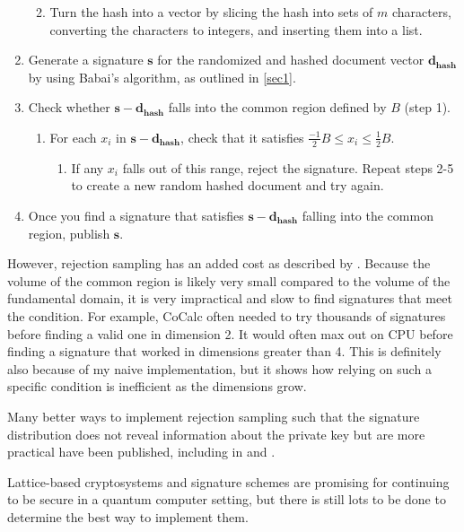 \documentclass[11pt,reqno]{amsart}
\theoremstyle{definition}
\begin{document}
\begin{enumerate}
\begin{enumerate}
\begin{enumerate}
        \end{enumerate}
        \item Turn the hash into a vector by slicing the hash into sets of $m$ characters, converting the characters to integers, and inserting them into a list.
    \end{enumerate}
    \item Generate a signature $\mathbf{s}$ for the randomized and hashed document vector $\mathbf{d_{\text{hash}}}$ by using Babai's algorithm, as outlined in \ref{sec1}.
    \item Check whether $\mathbf{s - d_{\text{hash}}}$ falls into the common region defined by $B$ (step 1).
    \begin{enumerate}
        \item For each $x_i$ in $\mathbf{s - d_{\text{hash}}}$, check that it satisfies $\frac{-1}{2}B \leq x_i \leq \frac{1}{2}B$.
        \begin{enumerate}
            \item If any $x_i$ falls out of this range, reject the signature. Repeat steps 2-5 to create a new random hashed document and try again.
        \end{enumerate}
    \end{enumerate}
    \item Once you find a signature that satisfies $\mathbf{s - d_{\text{hash}}}$ falling into the common region, publish $\mathbf{s}$.
\end{enumerate}

\vspace{\baselineskip}
However, rejection sampling has an added cost as described by \cite{lubshevky}. Because the volume of the common region is likely very small compared to the volume of the fundamental domain, it is very impractical and slow to find signatures that meet the condition. For example, CoCalc often needed to try thousands of signatures before finding a valid one in dimension 2.
It would often max out on CPU before finding a signature that worked in dimensions greater than 4. This is definitely also because of my naive implementation, but it shows how relying on such a specific condition is inefficient as the dimensions grow.

Many better ways to implement rejection sampling such that the signature distribution does not reveal information about the private key but are more practical have been published, including in \cite{lubshevky} and \cite{betterschemes}.

Lattice-based cryptosystems and signature schemes are promising for continuing to be secure in a quantum computer setting, but there is still lots to be done to determine the best way to implement them. 



\end{document}
